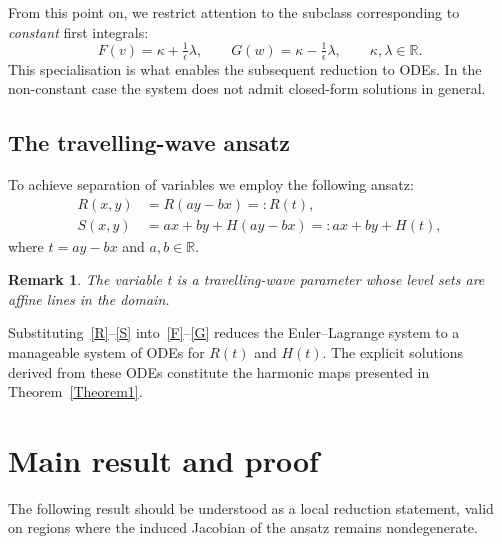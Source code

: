 \documentclass[12pt]{amsart}
\newtheorem{remark}[theorem]{Remark}
\begin{document}
From this point on, we restrict attention to the subclass
corresponding to \emph{constant} first integrals:
\begin{equation}\label{F and G}
F(v) = \kappa + \tfrac{1}{\epsilon}\lambda,
\qquad
G(w) = \kappa - \tfrac{1}{\epsilon}\lambda,
\qquad \kappa,\lambda \in \mathbb{R}.
\end{equation}
This specialisation is what enables the subsequent reduction to
ODEs. In the non-constant case the system does not admit closed-form solutions in general.

\subsection{The travelling-wave ansatz}

To achieve separation of variables we employ the following ansatz:
\begin{align}
R(x,y) &= R(ay - bx) =: R(t), \label{R} \\
S(x,y) &= ax + by + H(ay - bx) =: ax + by + H(t), \label{S}
\end{align}
where $t = ay - bx$ and $a, b \in \mathbb{R}$.

\begin{remark}\label{rem:ansatz-motivation}
The variable t is a travelling-wave parameter whose level sets are affine lines in the domain.
\end{remark}

Substituting~\eqref{R}--\eqref{S} into~\eqref{F}--\eqref{G} reduces
the Euler--Lagrange system to a manageable system of ODEs for $R(t)$
and $H(t)$. The explicit solutions derived from these ODEs constitute
the harmonic maps presented in Theorem~\ref{Theorem1}.

\section{Main result and proof}
The following result should be understood as a local reduction statement, valid on regions where the induced Jacobian of the ansatz remains nondegenerate.
\end{document}
